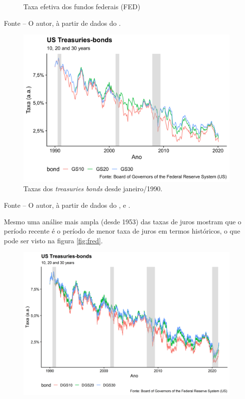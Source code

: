 \documentclass[
	12pt,				%
	oneside,			%
	a4paper,			%
	chapter=TITLE,		%
	section=TITLE,		%
	english,			%
	brazil				%
	]{abntex2}
\newcommand{\bcenter}{\begin{center}}
\newcommand{\ecenter}{\end{center}}
\begin{document}
\begin{refsection}
\begin{figure}[H]
{}

\caption{Taxa efetiva dos fundos federais (FED)}\label{fig:effr}
\end{figure}
\bcenter

\small Fonte -- O autor, à partir de dados do \textcite{fredeffr}.
\ecenter
\begin{figure}[H]

{\centering \includegraphics[width=0.7\linewidth]{images/yields-1} 

}

\caption{Taxas dos \emph{treasuries bonds} desde janeiro/1990.}\label{fig:yields}
\end{figure}
\bcenter

\small Fonte -- O autor, à partir de dados do \textcite{fredgs10}, \autocite*{fredgs20} e \autocite*{fredgs30}.
\ecenter

Mesmo uma análise mais ampla (desde 1953) das taxas de juros mostram que o
período recente é o período de menor taxa de juros em termos históricos, o que
pode ser visto na figura \ref{fig:fred}.
\begin{figure}[H]

{\centering \includegraphics[width=0.7\linewidth]{images/yields2-1} 

}


\end{figure}
\end{refsection}
\end{document}
